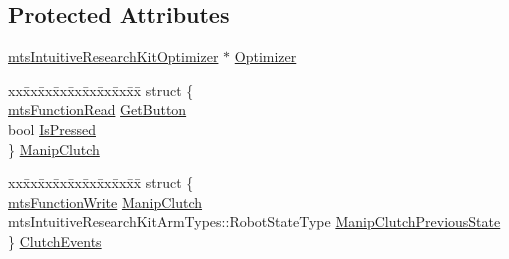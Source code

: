 \subsection*{Protected Attributes}
\begin{DoxyCompactItemize}
\item 
\hyperlink{classmts_intuitive_research_kit_optimizer}{mts\+Intuitive\+Research\+Kit\+Optimizer} $\ast$ \hyperlink{classmts_intuitive_research_kit_p_s_m_a3ca72df1e884e0d754b6ac688f0715f0}{Optimizer}
\item 
\begin{tabbing}
xx\=xx\=xx\=xx\=xx\=xx\=xx\=xx\=xx\=\kill
struct \{\\
\>\hyperlink{classmts_function_read}{mtsFunctionRead} \hyperlink{classmts_intuitive_research_kit_p_s_m_aa4f1aaa075c8c71a96ddcba9336d0e0a}{GetButton}\\
\>bool \hyperlink{classmts_intuitive_research_kit_p_s_m_a78a247dc70ea5b9a26a2bd40be409e16}{IsPressed}\\
\} \hyperlink{classmts_intuitive_research_kit_p_s_m_a211549ce3f5e8b7562cc80b3cc0508db}{ManipClutch}\\

\end{tabbing}\item 
\begin{tabbing}
xx\=xx\=xx\=xx\=xx\=xx\=xx\=xx\=xx\=\kill
struct \{\\
\>\hyperlink{classmts_function_write}{mtsFunctionWrite} \hyperlink{classmts_intuitive_research_kit_p_s_m_a02491aec085bb8e079ea0ec2dc11b278}{ManipClutch}\\
\>mtsIntuitiveResearchKitArmTypes::RobotStateType \hyperlink{classmts_intuitive_research_kit_p_s_m_ab4a9f5daf47990c0b59c433775aba897}{ManipClutchPreviousState}\\
\} \hyperlink{classmts_intuitive_research_kit_p_s_m_a76d7e00af4cc4e687101adaa00a8f670}{ClutchEvents}\\


\end{tabbing}
\end{DoxyCompactItemize}
